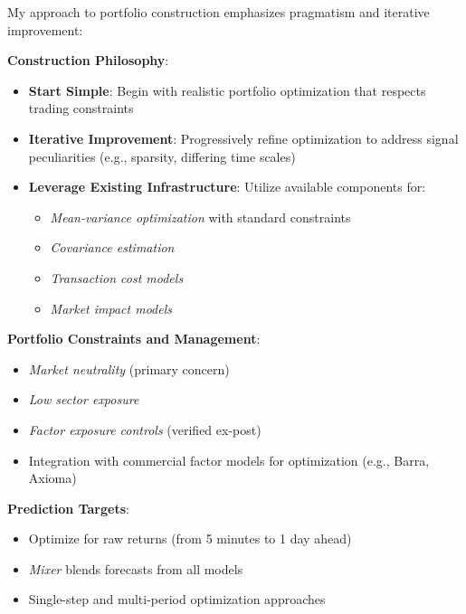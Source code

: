 \documentclass[11pt, letterpaper]{article}
\begin{document}
  My approach to portfolio construction emphasizes pragmatism and iterative
  improvement:

  \textbf{Construction Philosophy}:

  \begin{itemize}
    \item \textbf{Start Simple}: Begin with realistic portfolio optimization
      that respects trading constraints

    \item \textbf{Iterative Improvement}: Progressively refine optimization
      to address signal peculiarities (e.g., sparsity, differing time scales)

    \item \textbf{Leverage Existing Infrastructure}: Utilize available
      components for:

      \begin{itemize}
        \item \textit{Mean-variance optimization} with standard constraints

        \item \textit{Covariance estimation}

        \item \textit{Transaction cost models}

        \item \textit{Market impact models}
      \end{itemize}
  \end{itemize}

  \textbf{Portfolio Constraints and Management}:

  \begin{itemize}
    \item \textit{Market neutrality} (primary concern)

    \item \textit{Low sector exposure}

    \item \textit{Factor exposure controls} (verified ex-post)

    \item Integration with commercial factor models for optimization (e.g.,
      Barra, Axioma)
  \end{itemize}

  \textbf{Prediction Targets}:

  \begin{itemize}
    \item Optimize for raw returns (from 5 minutes to 1 day ahead)

    \item \textit{Mixer} blends forecasts from all models

    \item Single-step and multi-period optimization approaches
  \end{itemize}
\end{document}
